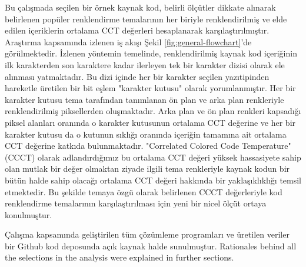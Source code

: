 \documentclass{article}
\begin{document}
Bu çalışmada seçilen bir örnek kaynak kod, belirli ölçütler dikkate alınarak belirlenen popüler renklendirme temalarının
her biriyle renklendirilmiş ve elde edilen içeriklerin ortalama CCT değerleri hesaplanarak karşılaştırılmıştır.
Araştırma kapsamında izlenen iş akışı Şekil \ref{fig:general-flowchart}'de görülmektedir. İzlenen yöntemin temelinde,
renklendirilmiş kaynak kod içeriğinin ilk karakterden son karaktere kadar ilerleyen tek bir karakter dizisi olarak ele
alınması yatmaktadır. Bu dizi içinde her bir karakter seçilen yazıtipinden hareketle üretilen bir bit eşlem "karakter
kutusu" olarak yorumlanmıştır. Her bir karakter kutusu tema tarafından tanımlanan ön plan ve arka plan renkleriyle
renklendirilmiş piksellerden oluşmaktadır. Arka plan ve ön plan renkleri kapsadığı piksel alanları oranında o karakter
kutusunun ortalama CCT değerine ve her bir karakter kutusu da o kutunun sıklığı oranında içeriğin tamamına ait ortalama
CCT değerine katkıda bulunmaktadır. "Correlated Colored Code Temperature" (CCCT) olarak adlandırdığımız bu ortalama CCT
değeri yüksek hassasiyete sahip olan mutlak bir değer olmaktan ziyade ilgili tema renkleriyle kaynak kodun bir bütün
halde sahip olacağı ortalama CCT değeri hakkında bir yaklaşıklıklığı temsil etmektedir. Bu şekilde temaya özgü
olarak belirlenen CCCT değerleriyle kod renklendirme temalarının karşılaştırılması için yeni bir nicel ölçüt ortaya
konulmuştur.

Çalışma kapsamında geliştirilen tüm çözümleme programları ve üretilen veriler bir Github kod deposunda açık kaynak halde
sunulmuştur\cite{Oktas_Code_CCT_2022}. Rationales behind all the selections in the analysis were explained in further
sections.

\begin{comment}
In this study, the CCT was utilized to calculate the quantity of blue light contained in popular color themes chosen by developers. It was observed that the average CCT values of both the dark and light versions of the examined themes were above the D65 threshold and contained intense blue light. Theme developers should consider the risks that blue light poses to human eye health while creating their themes.

The amount of blue light in the color theme was determined using the workflow shown in Figure
\ref{fig:general-flowchart}. Primarily, the themes to be used in the study were selected.
\end{comment}
\end{document}
